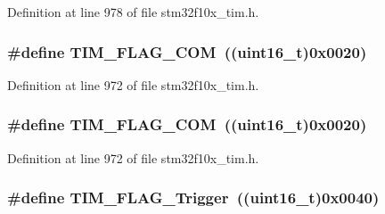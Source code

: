 Definition at line 978 of file stm32f10x\+\_\+tim.\+h.

\subsubsection[{\texorpdfstring{T\+I\+M\+\_\+\+F\+L\+A\+G\+\_\+\+C\+OM}{TIM_FLAG_COM}}]{\setlength{\rightskip}{0pt plus 5cm}\#define T\+I\+M\+\_\+\+F\+L\+A\+G\+\_\+\+C\+OM~(({\bf uint16\+\_\+t})0x0020)}\hypertarget{group___t_i_m___flags_gad454d70205ce5bbf3b3c0e7e43d6df62}{}\label{group___t_i_m___flags_gad454d70205ce5bbf3b3c0e7e43d6df62}


Definition at line 972 of file stm32f10x\+\_\+tim.\+h.

\subsubsection[{\texorpdfstring{T\+I\+M\+\_\+\+F\+L\+A\+G\+\_\+\+C\+OM}{TIM_FLAG_COM}}]{\setlength{\rightskip}{0pt plus 5cm}\#define T\+I\+M\+\_\+\+F\+L\+A\+G\+\_\+\+C\+OM~(({\bf uint16\+\_\+t})0x0020)}\hypertarget{group___t_i_m___flags_gad454d70205ce5bbf3b3c0e7e43d6df62}{}\label{group___t_i_m___flags_gad454d70205ce5bbf3b3c0e7e43d6df62}


Definition at line 972 of file stm32f10x\+\_\+tim.\+h.

\subsubsection[{\texorpdfstring{T\+I\+M\+\_\+\+F\+L\+A\+G\+\_\+\+Trigger}{TIM_FLAG_Trigger}}]{\setlength{\rightskip}{0pt plus 5cm}\#define T\+I\+M\+\_\+\+F\+L\+A\+G\+\_\+\+Trigger~(({\bf uint16\+\_\+t})0x0040)}\hypertarget{group___t_i_m___flags_gaeca2f17eea738dbec7eee8ecbe442814}{}\label{group___t_i_m___flags_gaeca2f17eea738dbec7eee8ecbe442814}


